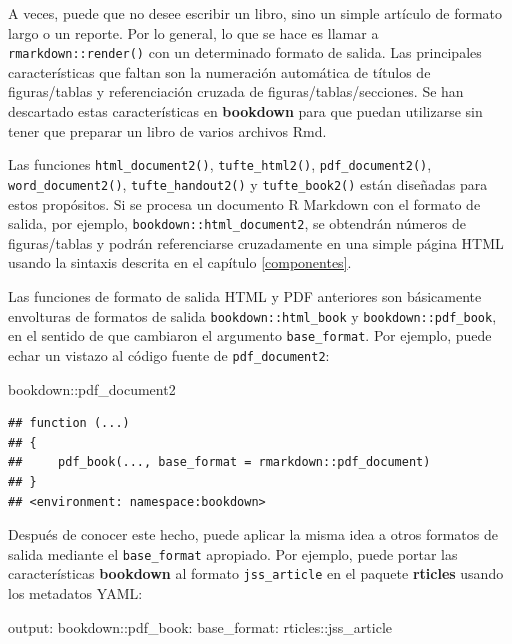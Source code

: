 \documentclass[12pt,]{krantz}
\makeatletter
\newenvironment{Shaded}{\begin{snugshade}}{\end{snugshade}}
\newcommand{\FunctionTok}[1]{\textcolor[rgb]{0.00,0.00,0.00}{{#1}}}
\newcommand{\NormalTok}[1]{{#1}}
\newenvironment{kframe}{%
\medskip{}
\setlength{\fboxsep}{.8em}
 \def\at@end@of@kframe{}%
 \ifinner\ifhmode%
  \def\at@end@of@kframe{\end{minipage}}%
  \begin{minipage}{\columnwidth}%
 \fi\fi%
 \def\FrameCommand##1{\hskip\@totalleftmargin \hskip-\fboxsep
 \colorbox{shadecolor}{##1}\hskip-\fboxsep
     \hskip-\linewidth \hskip-\@totalleftmargin \hskip\columnwidth}%
 \MakeFramed {\advance\hsize-\width
   \@totalleftmargin\z@ \linewidth\hsize
   \@setminipage}}%
 {\par\unskip\endMakeFramed%
 \at@end@of@kframe}
\renewenvironment{Shaded}{\begin{kframe}}{\end{kframe}}
\theoremstyle{definition}
\theoremstyle{definition}
\theoremstyle{remark}
\makeatother
\begin{document}
A veces, puede que no desee escribir un libro, sino un simple artículo
de formato largo o un reporte. Por lo general, lo que se hace es llamar
a \texttt{rmarkdown::render()} con un determinado formato de salida. Las
principales características que faltan son la numeración automática de
títulos de figuras/tablas y referenciación cruzada de
figuras/tablas/secciones. Se han descartado estas características en
\textbf{bookdown} para que puedan utilizarse sin tener que preparar un
libro de varios archivos Rmd.

Las funciones \texttt{html\_document2()}, \texttt{tufte\_html2()},
\texttt{pdf\_document2()}, \texttt{word\_document2()},
\texttt{tufte\_handout2()} y \texttt{tufte\_book2()} están diseñadas
para estos propósitos. Si se procesa un documento R Markdown con el
formato de salida, por ejemplo, \texttt{bookdown::html\_document2}, se
obtendrán números de figuras/tablas y podrán referenciarse cruzadamente
en una simple página HTML usando la sintaxis descrita en el capítulo
\ref{componentes}.

Las funciones de formato de salida HTML y PDF anteriores son básicamente
envolturas de formatos de salida \texttt{bookdown::html\_book} y
\texttt{bookdown::pdf\_book}, en el sentido de que cambiaron el
argumento \texttt{base\_format}. Por ejemplo, puede echar un vistazo al
código fuente de \texttt{pdf\_document2}:

\begin{Shaded}
\begin{Highlighting}[]
\NormalTok{bookdown::pdf_document2}
\end{Highlighting}
\end{Shaded}

\begin{verbatim}
## function (...) 
## {
##     pdf_book(..., base_format = rmarkdown::pdf_document)
## }
## <environment: namespace:bookdown>
\end{verbatim}

Después de conocer este hecho, puede aplicar la misma idea a otros
formatos de salida mediante el \texttt{base\_format} apropiado. Por
ejemplo, puede portar las características \textbf{bookdown} al formato
\texttt{jss\_article} en el paquete \textbf{rticles} \citep{R-rticles}
usando los metadatos YAML:

\begin{Shaded}
\begin{Highlighting}[]
\FunctionTok{output:}
  \FunctionTok{bookdown:}\NormalTok{:pdf_book:}
    \FunctionTok{base_format:} \NormalTok{rticles::jss_article}
\end{Highlighting}
\end{Shaded}
\end{document}
